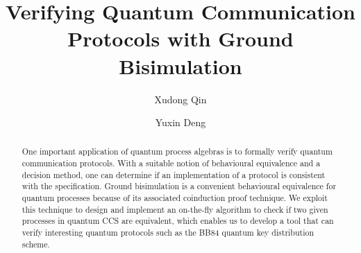\documentclass[runningheads]{llncs}
\begin{document}
%
\title{Verifying Quantum Communication Protocols with Ground Bisimulation}
%
%
\author{Xudong Qin \and
Yuxin Deng}
%
%
%
\maketitle              %
%
\begin{abstract}
	
One important application of quantum process algebras is to formally verify quantum communication protocols. With a suitable notion of behavioural equivalence and a decision method, one can determine if an implementation of a protocol is consistent with the specification. Ground bisimulation is a convenient behavioural equivalence for quantum processes because of its associated coinduction proof technique. We exploit this technique to design and implement an on-the-fly algorithm to check if two given processes in quantum CCS are equivalent, which enables us to develop a tool that can verify interesting quantum protocols such as the BB84 quantum key distribution scheme.

\end{abstract}
%
%
%
\end{document}
